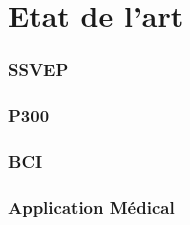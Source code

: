 \part{Etat de l'art} %
\label{prt:etat}
	\section{SSVEP} %
	\label{sec:technique_ssvep}
	\section{P300} %
	\label{sec:technique_p300}
	\section{BCI} %
	\label{sec:bci}
	\section{Application Médical} %
	\label{sec:application_médical}
	
